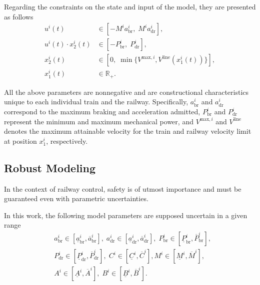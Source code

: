 Regarding the constraints on the state and input of the model, they are presented as follows
%
\begin{subequations} \label{eq:modelConstraints}
	\begin{align}
		u^i(t) &\in \left[-M^i a_{\mathrm{br}}^i, \;M^i a_{\mathrm{dr}}^i \right], \label{eq:lim1} \\
		u^i(t) \cdot x_2^i(t)&\in \left[-P^i_{\mathrm{br}}, \;P^i_{\mathrm{dr}}\right], \label{eq:lim2} \\
		x_2^i(t) &\in \left[0, \;\min\{V^{\mathrm{max},i},V^{\mathrm{line}}(x_1^i(t))\}\right], \label{eq:lim5} \\
		x_1^i(t) &\in \mathbb{R}_{+}. \label{eq:lim4}  
	\end{align}
\end{subequations}
%

All the above parameters are nonnegative and are constructional characteristics unique to each individual train and the railway.  Specifically,  $a_{\mathrm{br}}^i $ and $a_{\mathrm{dr}}^i$ correspond to the maximum braking and acceleration admitted, $P^i_{\mathrm{br}}$ and $P^i_{\mathrm{dr}}$ represent the minimum and maximum mechanical power, and $V^{\mathrm{max},i}$ and $V^{\mathrm{line}}$ denotes the maximum attainable velocity for the train and railway velocity limit at position $x_1^i$, respectively.



\subsection{Robust Modeling}
\label{subsec:robustModeling}
%
In the context of railway control, safety is of utmost importance and must be guaranteed even with parametric uncertainties. 

In this work, the following model parameters are supposed uncertain in a given range
%
\begin{eqnarray}\label{eq:train_intervals}
	&a_{\mathrm{br}}^i \in [\underline{a}_{\mathrm{br}}^i , \overline{a}_{\mathrm{br}}^i], \;
	a_{\mathrm{dr}}^i \in [\underline{a}_{\mathrm{dr}}^i , \overline{a}_{\mathrm{dr}}^i],  \;
	P^i_{\mathrm{br}} \in [\underline{P}_{\mathrm{br}}^i , \overline{P}_{\mathrm{br}}^i]  , \nonumber \\
	&P^i_{\mathrm{dr}} \in [\underline{P}_{\mathrm{dr}}^i , \overline{P}_{\mathrm{dr}}^i],   \;
	C^i \in [\underline{C}^i , \overline{C}^i ] , M^i \in [\underline{M}^i , \overline{M}^i], \;\nonumber \\
	& A^i \in [\underline{A}^i , \overline{A}^i] ,  \;
	B^i \in [\underline{B}^i , \overline{B}^i] .
\end{eqnarray}



